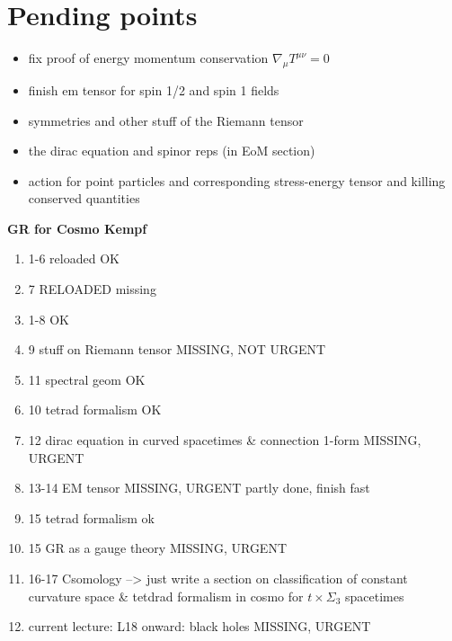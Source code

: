 \chapter*{Pending points}






\begin{itemize}
    \item fix proof of energy momentum conservation $\nabla_\mu T^{\mu\nu}=0$
    \item finish em tensor for spin 1/2 and spin 1 fields
    \item symmetries and other stuff of the Riemann tensor
    \item the dirac equation and spinor reps (in EoM section)
    \item action for point particles and corresponding stress-energy tensor and killing conserved quantities
\end{itemize}



\textbf{GR for Cosmo Kempf}
\begin{enumerate}
    \item 1-6 reloaded {\color{blue} OK}
    \item 7 RELOADED {\color{red} missing}
    \item 1-8 {\color{blue} OK}
    \item 9 stuff on Riemann tensor {\color{red}MISSING, NOT URGENT}
    \item 11 spectral geom {\color{blue} OK}
    \item 10 tetrad formalism {\color{blue} OK}
    \item 12 dirac equation in curved spacetimes \& connection 1-form {\color{red}MISSING, URGENT}
    \item 13-14 EM tensor {\color{red}MISSING, URGENT} {\color{blue} partly done, finish fast}
    \item 15 tetrad formalism {\color{blue}ok}
    \item 15 GR as a gauge theory {\color{red}MISSING, URGENT}
    \item 16-17 Csomology --> just write a section on classification of constant curvature space \& tetdrad formalism in cosmo for $t\times \Sigma_3$ spacetimes
    \item {\color{red} current lecture: L18 onward:  black holes MISSING, URGENT}
\end{enumerate}